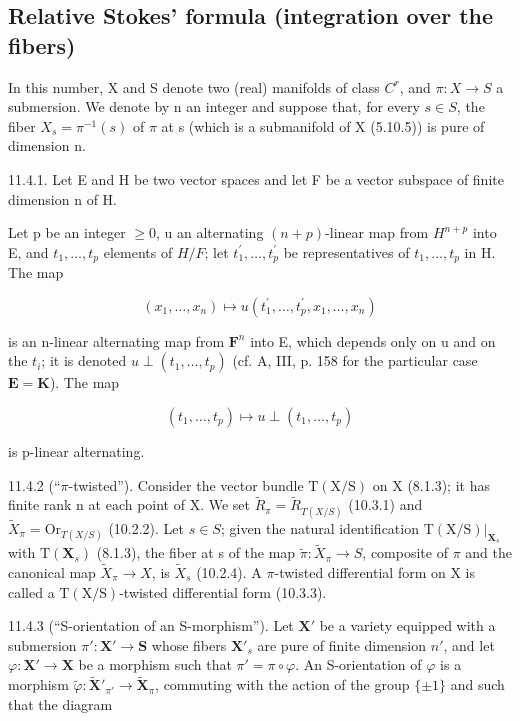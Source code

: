 \subsection{Relative Stokes' formula (integration over the fibers)}

In this number, X and S denote two (real) manifolds of class \(C^{r}\), and \(\pi: X \to S\) a submersion. We denote by n an integer and suppose that, for every \(s \in S\), the fiber \(X_{s} = \pi^{-1}(s)\) of \(\pi\) at s (which is a submanifold of X (5.10.5)) is pure of dimension n.

11.4.1. Let E and H be two vector spaces and let F be a vector subspace of finite dimension n of H.

Let p be an integer \(\geqslant0\), u an alternating \((n+p)\)-linear map from \(H^{n+p}\) into E, and \(t_{1},\ldots,t_{p}\) elements of \(H/F\); let \(t_{1}^{\prime},\ldots,t_{p}^{\prime}\) be representatives of \(t_{1},\ldots,t_{p}\) in H. The map

\[
(x _ {1}, \dots , x _ {n}) \mapsto u (t _ {1} ^ {\prime}, \dots , t _ {p} ^ {\prime}, x _ {1}, \dots , x _ {n})
\]

is an n-linear alternating map from \(\mathbf{F}^n\) into E, which depends only on u and on the \(t_i\); it is denoted \(u \perp (t_1, \ldots, t_p)\) (cf. A, III, p. 158 for the particular case \(\mathbf{E} = \mathbf{K}\)). The map

\[
\left(t _ {1}, \dots , t _ {p}\right) \mapsto u \perp \left(t _ {1}, \dots , t _ {p}\right)
\]

is p-linear alternating.

11.4.2 (“\(\pi\)-twisted”). Consider the vector bundle \(\mathrm{T}(\mathrm{X}/\mathrm{S})\) on X (8.1.3); it has finite rank n at each point of X. We set \(\tilde{R}_{\pi} = \tilde{R}_{T(X/S)}\) (10.3.1) and \(\tilde{X}_{\pi} = \mathrm{Or}_{T(X/S)}\) (10.2.2). Let \(s \in S\); given the natural identification \(\mathrm{T}(\mathrm{X}/\mathrm{S})|_{\mathbf{X}_{s}}\) with \(\mathrm{T}(\mathbf{X}_{s})\) (8.1.3), the fiber at s of the map \(\tilde{\pi}: \tilde{X}_{\pi} \to S\), composite of \(\pi\) and the canonical map \(\tilde{X}_{\pi} \to X\), is \(\tilde{X}_{s}\) (10.2.4). A \(\pi\)-twisted differential form on X is called a \(\mathrm{T}(\mathrm{X}/\mathrm{S})\)-twisted differential form (10.3.3).

11.4.3 (“S-orientation of an S-morphism”). Let \(\mathbf{X}'\) be a variety equipped with a submersion \(\pi'\colon\mathbf{X}'\to\mathbf{S}\) whose fibers \(\mathbf{X}'_{s}\) are pure of finite dimension \(n'\), and let \(\varphi\colon\mathbf{X}'\to\mathbf{X}\) be a morphism such that \(\pi'=\pi\circ\varphi\). An S-orientation of \(\varphi\) is a morphism \(\tilde{\varphi}\colon\tilde{\mathbf{X}}'_{\pi'}\to\tilde{\mathbf{X}}_{\pi}\), commuting with the action of the group \(\{\pm1\}\) and such that the diagram

